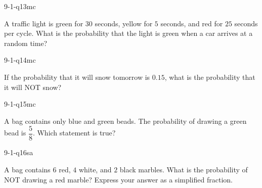 \begin{practiceQuestion}{9-1-q13}{mc}
\begin{questionText}
A traffic light is green for $30$ seconds, yellow for $5$ seconds, and red for $25$ seconds per cycle. What is the probability that the light is green when a car arrives at a random time?
\end{questionText}
\end{practiceQuestion}

\begin{practiceQuestion}{9-1-q14}{mc}
\begin{questionText}
If the probability that it will snow tomorrow is $0.15$, what is the probability that it will NOT snow?
\end{questionText}
\end{practiceQuestion}

\begin{practiceQuestion}{9-1-q15}{mc}
\begin{questionText}
A bag contains only blue and green beads. The probability of drawing a green bead is $\dfrac{5}{8}$. Which statement is true?
\end{questionText}
\end{practiceQuestion}


\begin{practiceQuestion}{9-1-q16}{sa}
\begin{questionText}
A bag contains $6$ red, $4$ white, and $2$ black marbles. What is the probability of NOT drawing a red marble? Express your answer as a simplified fraction.
\end{questionText}
\end{practiceQuestion}


